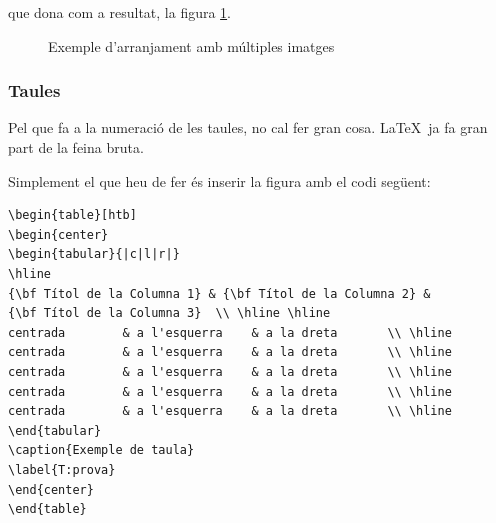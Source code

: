 que dona com a resultat, la figura \ref{F:prova2}.

\begin{figure}[htb]
  \begin{center}
    \begin{subfigmatrix}{3}
    \end{subfigmatrix}
    \caption{Exemple d'arranjament amb múltiples imatges}
    \label{F:prova2}
  \end{center}
\end{figure}



\subsubsection{Taules}

Pel que fa a la numeració de les taules, no cal fer gran cosa. \LaTeX \ ja fa gran part de la feina bruta. 

Simplement el que heu de fer és inserir la figura amb el codi següent:

\begin{verbatim}
\begin{table}[htb]
\begin{center}
\begin{tabular}{|c|l|r|}
\hline
{\bf Títol de la Columna 1} & {\bf Títol de la Columna 2} & 
{\bf Títol de la Columna 3}  \\ \hline \hline
centrada        & a l'esquerra    & a la dreta       \\ \hline
centrada        & a l'esquerra    & a la dreta       \\ \hline
centrada        & a l'esquerra    & a la dreta       \\ \hline
centrada        & a l'esquerra    & a la dreta       \\ \hline
centrada        & a l'esquerra    & a la dreta       \\ \hline
\end{tabular}
\caption{Exemple de taula}
\label{T:prova}
\end{center}
\end{table}
\end{verbatim}

